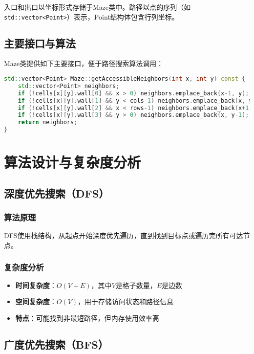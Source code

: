\documentclass[UTF8]{ctexart}
\begin{document}
入口和出口以坐标形式存储于Maze类中。路径以点的序列（如\texttt{std::vector<Point>}）表示，Point结构体包含行列坐标。

\subsection{主要接口与算法}

Maze类提供如下主要接口，便于路径搜索算法调用：

\begin{lstlisting}[language=C++, caption={获取可通行相邻格点}]
std::vector<Point> Maze::getAccessibleNeighbors(int x, int y) const {
    std::vector<Point> neighbors;
    if (!cells[x][y].wall[0] && x > 0) neighbors.emplace_back(x-1, y);
    if (!cells[x][y].wall[1] && y < cols-1) neighbors.emplace_back(x, y+1);
    if (!cells[x][y].wall[2] && x < rows-1) neighbors.emplace_back(x+1, y);
    if (!cells[x][y].wall[3] && y > 0) neighbors.emplace_back(x, y-1);
    return neighbors;
}
\end{lstlisting}



\section{算法设计与复杂度分析}

\subsection{深度优先搜索（DFS）}

\subsubsection{算法原理}
DFS使用栈结构，从起点开始深度优先遍历，直到找到目标点或遍历完所有可达节点。


\subsubsection{复杂度分析}
\begin{itemize}
    \item \textbf{时间复杂度}：$O(V + E)$，其中$V$是格子数量，$E$是边数
    \item \textbf{空间复杂度}：$O(V)$，用于存储访问状态和路径信息
    \item \textbf{特点}：可能找到非最短路径，但内存使用效率高
\end{itemize}

\subsection{广度优先搜索（BFS）}
\end{document}
